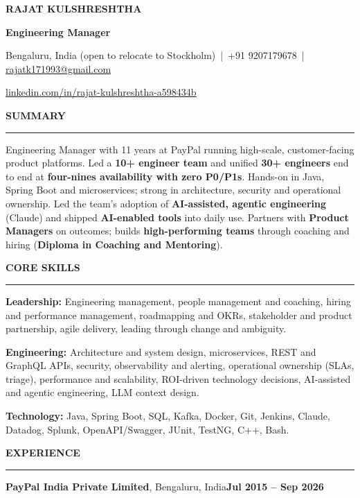 \documentclass[10pt,a4paper]{article}
\renewcommand{\normalsize}{\fontsize{9.4}{10.7}\selectfont}
\newcommand{\bd}[1]{\textbf{#1}}
\newcommand{\sect}[1]{%
  \par\vspace{4pt}%
  {\bfseries\fontsize{10}{11.5}\selectfont #1}\par\nointerlineskip
  \vspace{1pt}\noindent\rule{\linewidth}{0.6pt}\par\vspace{2.5pt}}
\newcommand{\company}[3]{%
  \par\vspace{2pt}\noindent\textbf{#1}, #2\hfill\textbf{#3}\par\nopagebreak}
\begin{document}
\normalsize

\centerline{\bfseries\fontsize{15}{17}\selectfont RAJAT KULSHRESHTHA}
\vspace{1pt}
\centerline{\bfseries\fontsize{10.5}{12}\selectfont Engineering Manager}
\vspace{2pt}
\centerline{Bengaluru, India (open to relocate to Stockholm) \,|\, +91 9207179678 \,|\,
  \href{mailto:rajatk171993@gmail.com}{rajatk171993@gmail.com}}
\vspace{1pt}
\centerline{\href{https://www.linkedin.com/in/rajat-kulshreshtha-a598434b/}{linkedin.com/in/rajat-kulshreshtha-a598434b}}

\sect{SUMMARY}
Engineering Manager with 11 years at PayPal running high-scale, customer-facing product
platforms. Led a \bd{10+ engineer team} and unified \bd{30+ engineers} end to end at
\bd{four-nines availability with zero P0/P1s}. Hands-on in Java, Spring Boot and microservices;
strong in architecture, security and operational ownership. Led the team's adoption of \bd{AI-assisted,
 agentic engineering} (Claude) and shipped \bd{AI-enabled tools} into daily use. Partners with \bd{Product Managers}
on outcomes; builds \bd{high-performing teams} through coaching and hiring
(\bd{Diploma in Coaching and Mentoring}).

\sect{CORE SKILLS}
\textbf{Leadership:} Engineering management, people management and coaching, hiring and
performance management, roadmapping and OKRs, stakeholder and product partnership, agile
delivery, leading through change and ambiguity.\par
\textbf{Engineering:} Architecture and system design, microservices, REST and GraphQL APIs,
security, observability and alerting, operational ownership (SLAs, triage),
performance and scalability, ROI-driven technology decisions, AI-assisted and agentic engineering, LLM context
design.\par
\textbf{Technology:} Java, Spring Boot, SQL, Kafka, Docker, Git, Jenkins, Claude, Datadog,
Splunk, OpenAPI/Swagger, JUnit, TestNG, C++, Bash.

\sect{EXPERIENCE}
\company{PayPal India Private Limited}{Bengaluru, India}{Jul 2015 -- Sep 2026}
\end{document}
